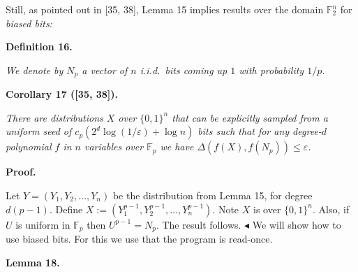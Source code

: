 \documentclass[10pt,a4paper]{article}
\begin{document}
Still, as pointed out in [35, 38], Lemma 15
implies results over the domain $\mathbb{F}_{2}^{n}$ for \emph{biased bits:}\par





\par\medskip\noindent\textbf{
\textbf{Definition 16}\textbf{.}
}\par



\emph{We denote by $N_{p}$ a vector of $n$ i.i.d. bits
coming up $1$ with probability $1/p$.}\par







\par\medskip\noindent\textbf{
\textbf{Corollary 17}\textbf{ }([35, 38])\textbf{.}
}\par



\emph{There are distributions $X$ over $\{0,1\}^{n}$ that can be explicitly sampled
from a uniform seed of $c_{p}(2^{d}\log(1/\varepsilon)+\log n)$ bits such that for
any degree-$d$ polynomial $f$ in $n$ variables over $\mathbb{F}_{p}$
we have $\Delta(f(X),f(N_{p}))\leq\varepsilon$.}\par







\par\medskip\noindent\textbf{Proof.}\par




Let $Y=(Y_{1},Y_{2},\ldots,Y_{n})$ be the distribution from Lemma 15,
for degree $d(p-1)$. Define $X:=(Y_{1}^{p-1},Y_{2}^{p-1},\ldots,Y_{n}^{p-1})$.
Note $X$ is over $\{0,1\}^{n}$. Also, if $U$ is uniform in $\mathbb{F}_{p}$
then $U^{p-1}=N_{p}$. The result follows.
$\blacktriangleleft$
We will show how to use biased bits. For this we use that the program
is read-once.\par





\par\medskip\noindent\textbf{
\textbf{Lemma 18}\textbf{.}
}\par
\end{document}
